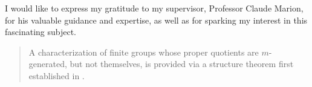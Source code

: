 
%
\begin{acknowledgements}

	I would like to express my gratitude to my supervisor, Professor Claude Marion, for his valuable guidance and expertise, as well as for sparking my interest in this fascinating subject.

\end{acknowledgements}

\addvspacetoc{0.3cm} %


\begin{abstract}
	A characterization of finite groups whose proper quotients are $m$-generated, but not themselves, is provided via a structure theorem first established in \cite{DallaVoltaFGNMGAPQ}.

\end{abstract}

%
%


\addvspacetoc{0.3cm}

\tableofcontents %

